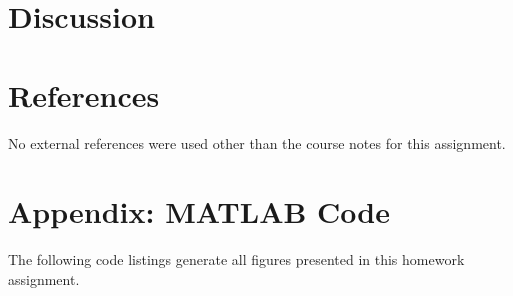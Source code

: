 \documentclass[11pt]{article}
\begin{document}
\section{Discussion} %

\section{References} %

No external references were used other than the course notes for this assignment.

\section*{Appendix: MATLAB Code} %

The following code listings generate all figures presented in this homework assignment.


\end{document}
